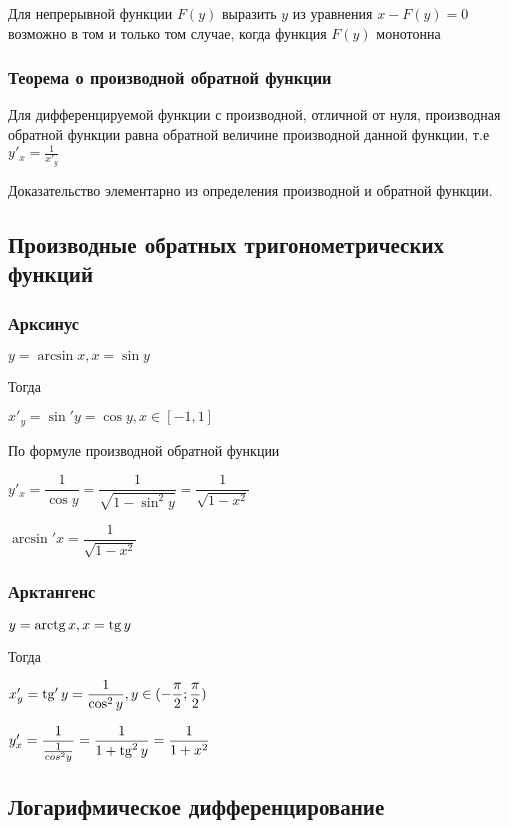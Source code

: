 Для непрерывной функции $F(y)$ выразить $y$ из уравнения $x - F(y) = 0$ возможно в том и только том случае, когда функция $F(y)$ монотонна

\subsubsection{Теорема о производной обратной функции}

Для дифференцируемой функции с производной, отличной от нуля, производная обратной функции равна обратной величине производной данной функции, т.е
$y'_x=\frac{1}{x'_y}$

Доказательство элементарно из определения производной и обратной функции.


\subsection{Производные обратных тригонометрических функций}

\subsubsection{Арксинус}

$ y = \arcsin x, x = \sin y $

Тогда

$ x'_y = \sin 'y  = \cos y, x \in [-1, 1] $

По формуле производной обратной функции

$ y'_{x} = \dfrac{1}{\cos y} = \dfrac{1}{ \sqrt{1 - \sin^{2} y} } = \dfrac{1}{ \sqrt{1 - x^{2}} } $

$ \arcsin'{x} = \dfrac{1}{ \sqrt{1 - x^{2}} } $

\subsubsection{Арктангенс}

$ y = \operatorname{arctg} x, x = \operatorname{tg} y $

Тогда

$ x'_y = \operatorname{tg} 'y = \dfrac{1}{\cos^{2}y}, y \in (-\dfrac{\pi}{2};\dfrac{\pi}{2}) $

$ y'_{x} = \dfrac{1}{\frac{1}{cos^{2}y}} = \dfrac{1}{1+\operatorname{tg}^{2} y} = \dfrac{1}{1+x^{2}} $

\subsection{Логарифмическое дифференцирование}

